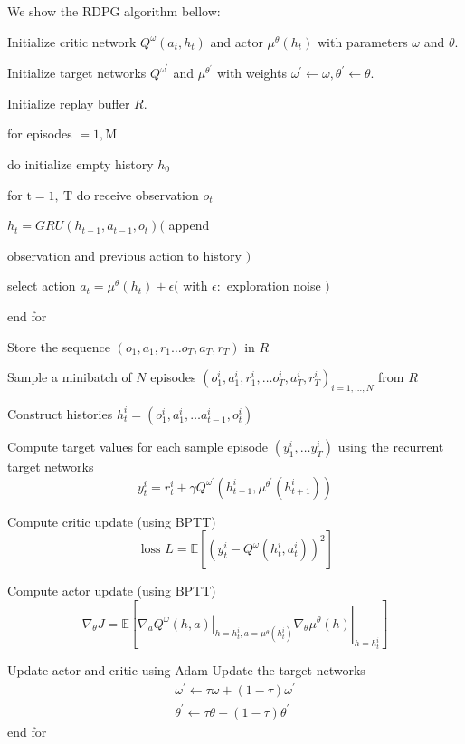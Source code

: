 We show the RDPG algorithm bellow:

\begin{small}
\quad\quad

\quad\quad Initialize critic network $Q^{\omega}\left(a_{t}, h_{t}\right)$ and actor $\mu^{\theta}\left(h_{t}\right)$ with parameters $\omega$ and $\theta$. 

\quad\quad Initialize target networks $Q^{\omega^{\prime}}$ and $\mu^{\theta^{\prime}}$ with weights $\omega^{\prime} \leftarrow \omega, \theta^{\prime} \leftarrow \theta$.

\quad\quad Initialize replay buffer $R$. 

\quad\quad for episodes $=1, \mathrm{M}$ 

\quad\quad\quad\quad do initialize empty history $h_{0}$ 

\quad\quad\quad\quad for $\mathrm{t}=1, \mathrm{~T}$ do receive observation $o_{t}$

\quad\quad\quad\quad\quad\quad $h_{t}=G R U\left(h_{t-1}, a_{t-1}, o_{t}\right)($ append      

\quad\quad\quad\quad\quad\quad observation and previous action to history $)$ 

\quad\quad\quad\quad\quad\quad select action $a_{t}=\mu^{\theta}\left(h_{t}\right)+\epsilon($ with $\epsilon:$ exploration noise $)$ 
    
\quad\quad\quad\quad end for 
    
\quad\quad\quad\quad Store the sequence $\left(o_{1}, a_{1}, r_{1} \ldots o_{T}, a_{T}, r_{T}\right)$ in $R$ 
    
\quad\quad\quad\quad Sample a minibatch of $N$ episodes $\left(o_{1}^{i}, a_{1}^{i}, r_{1}^{i}, \ldots o_{T}^{i}, a_{T}^{i}, r_{T}^{i}\right)_{i=1, \ldots, N}$ from $R$
    
\quad\quad\quad\quad Construct histories $h_{t}^{i}=\left(o_{1}^{i}, a_{1}^{i}, \ldots a_{t-1}^{i}, o_{t}^{i}\right)$
    
\quad\quad\quad\quad Compute target values for each sample episode $\left(y_{1}^{i}, \ldots y_{T}^{i}\right)$ using the recurrent target networks
$$
y_{t}^{i}=r_{t}^{i}+\gamma Q^{\omega^{\prime}}\left(h_{t+1}^{i}, \mu^{\theta^{\prime}}\left(h_{t+1}^{i}\right)\right)
$$
    
\quad\quad\quad\quad Compute critic update (using BPTT)
$$
\text { loss } L=\mathbb{E}\left[\left(y_{t}^{i}-Q^{\omega}\left(h_{t}^{i}, a_{t}^{i}\right)\right)^{2}\right]
$$
    
\quad\quad\quad\quad Compute actor update (using BPTT)
$$
\nabla_{\theta} J=\mathbb{E}\left[\left.\left.\nabla_{a} Q^{\omega}(h, a)\right|_{h=h_{t}^{i}, a=\mu^{\theta}\left(h_{t}^{i}\right)} \nabla_{\theta} \mu^{\theta}(h)\right|_{h=h_{t}^{i}}\right]
$$
    
\quad\quad\quad\quad Update actor and critic using Adam Update the target networks
$$
    \begin{array}{r}
    \omega^{\prime} \leftarrow \tau \omega+(1-\tau) \omega^{\prime} \\
    \theta^{\prime} \leftarrow \tau \theta+(1-\tau) \theta^{\prime}
    \end{array}
$$
\quad\quad end for
\end{small}


